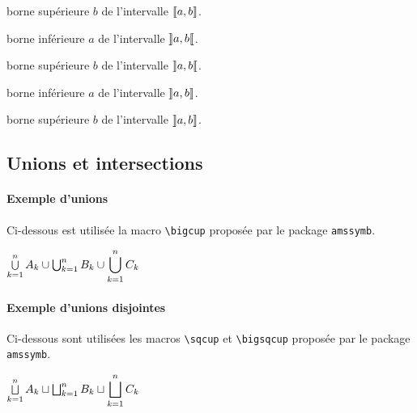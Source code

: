 \documentclass[12pt,a4paper]{article}
\theoremstyle{definition}
\begin{document}
 borne supérieure $b$ de l'intervalle $\ZintervalC{a}{b}$.


\bigskip




 borne inférieure $a$ de l'intervalle $\ZintervalO{a}{b}$.

 borne supérieure $b$ de l'intervalle $\ZintervalO{a}{b}$.


\bigskip




 borne inférieure $a$ de l'intervalle $\ZintervalOC{a}{b}$.

 borne supérieure $b$ de l'intervalle $\ZintervalOC{a}{b}$.






\subsection{Unions et intersections}

\paragraph{Exemple d'unions}

Ci-dessous est utilisée la macro \verb+\bigcup+ proposée par le package \verb+amssymb+.

\begin{tcblisting}{}
$\dcup_{k=1}^{n} A_k \cup \bigcup_{k=1}^{n} B_k \cup 
 \displaystyle \bigcup_{k=1}^{n} C_k$
\end{tcblisting}


\paragraph{Exemple d'unions disjointes}

Ci-dessous sont utilisées les macros \verb+\sqcup+ et \verb+\bigsqcup+ proposée par le package \verb+amssymb+.

\begin{tcblisting}{}
$\dsqcup_{k=1}^{n} A_k \sqcup \bigsqcup_{k=1}^{n} B_k \sqcup
 \displaystyle \bigsqcup_{k=1}^{n} C_k$
\end{tcblisting}
\end{document}
